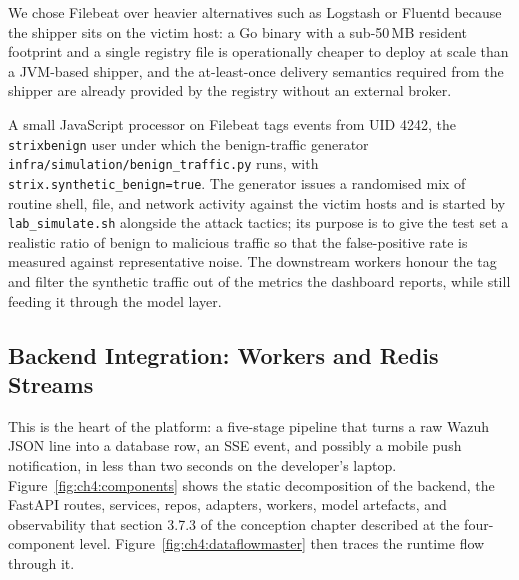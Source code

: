 We chose Filebeat over heavier alternatives such as Logstash or
Fluentd because the shipper sits on the victim host: a Go binary
with a sub-50\,MB resident footprint and a single registry file is
operationally cheaper to deploy at scale than a JVM-based shipper,
and the at-least-once delivery semantics required from the shipper
are already provided by the registry without an external broker.

A small JavaScript processor on Filebeat tags events from UID 4242,
the \texttt{strixbenign} user under which the benign-traffic generator
\texttt{infra/simulation/benign\_traffic.py} runs, with
\texttt{strix.synthetic\_benign=true}. The generator issues a
randomised mix of routine shell, file, and network activity against
the victim hosts and is started by \texttt{lab\_simulate.sh}
alongside the attack tactics; its purpose is to give the test set a
realistic ratio of benign to malicious traffic so that the
false-positive rate is measured against representative noise. The
downstream workers honour the tag and filter the synthetic traffic
out of the metrics the dashboard reports, while still feeding it
through the model layer.

\subsection{Backend Integration: Workers and Redis Streams}
\label{sec:integration}

This is the heart of the platform: a five-stage pipeline that turns a
raw Wazuh JSON line into a database row, an SSE event, and possibly a
mobile push notification, in less than two seconds on the developer's
laptop. Figure~\ref{fig:ch4:components} shows the static
decomposition of the backend, the FastAPI routes, services, repos,
adapters, workers, model artefacts, and observability that section
3.7.3 of the conception chapter described at the four-component level.
Figure~\ref{fig:ch4:dataflowmaster} then traces the runtime flow
through it.

